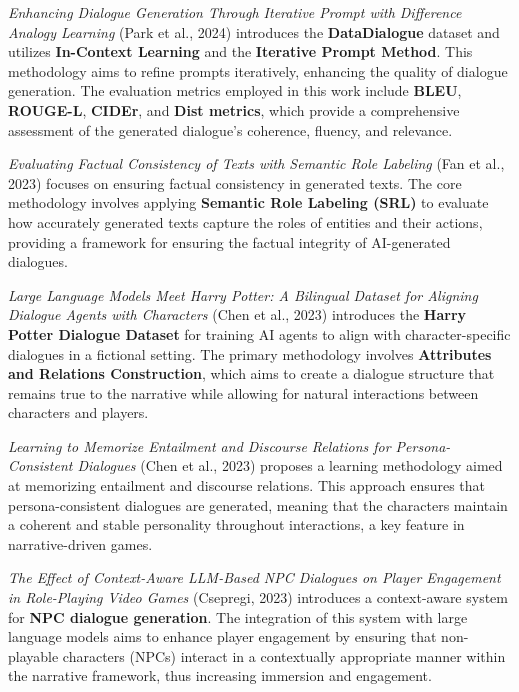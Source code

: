 \documentclass{article}
\begin{document}
\textit{Enhancing Dialogue Generation Through Iterative Prompt with Difference Analogy Learning} (Park et al., 2024) introduces the \textbf{DataDialogue} dataset and utilizes \textbf{In-Context Learning} and the \textbf{Iterative Prompt Method}. This methodology aims to refine prompts iteratively, enhancing the quality of dialogue generation. The evaluation metrics employed in this work include \textbf{BLEU}, \textbf{ROUGE-L}, \textbf{CIDEr}, and \textbf{Dist metrics}, which provide a comprehensive assessment of the generated dialogue's coherence, fluency, and relevance.

\textit{Evaluating Factual Consistency of Texts with Semantic Role Labeling} (Fan et al., 2023) focuses on ensuring factual consistency in generated texts. The core methodology involves applying \textbf{Semantic Role Labeling (SRL)} to evaluate how accurately generated texts capture the roles of entities and their actions, providing a framework for ensuring the factual integrity of AI-generated dialogues.

\textit{Large Language Models Meet Harry Potter: A Bilingual Dataset for Aligning Dialogue Agents with Characters} (Chen et al., 2023) introduces the \textbf{Harry Potter Dialogue Dataset} for training AI agents to align with character-specific dialogues in a fictional setting. The primary methodology involves \textbf{Attributes and Relations Construction}, which aims to create a dialogue structure that remains true to the narrative while allowing for natural interactions between characters and players.

\textit{Learning to Memorize Entailment and Discourse Relations for Persona-Consistent Dialogues} (Chen et al., 2023) proposes a learning methodology aimed at memorizing entailment and discourse relations. This approach ensures that persona-consistent dialogues are generated, meaning that the characters maintain a coherent and stable personality throughout interactions, a key feature in narrative-driven games.

\textit{The Effect of Context-Aware LLM-Based NPC Dialogues on Player Engagement in Role-Playing Video Games} (Csepregi, 2023) introduces a context-aware system for \textbf{NPC dialogue generation}. The integration of this system with large language models aims to enhance player engagement by ensuring that non-playable characters (NPCs) interact in a contextually appropriate manner within the narrative framework, thus increasing immersion and engagement.
\end{document}
